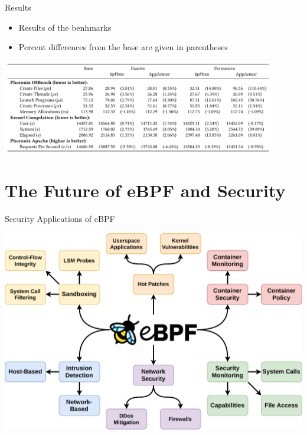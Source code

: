 \documentclass[12pt, dvipsnames, aspectratio=169]{beamer}
\begin{document}
\begin{frame}[c]{Results}
\begin{itemize}
    \item Results of the benhmarks
    \item Percent differences from the base are given in parentheses
\end{itemize}
\begin{center}
    \includegraphics[width=0.9\textwidth]{figs/performance-table.png}
\end{center}
\end{frame}

\section{The Future of eBPF and Security}

\begin{frame}[c]{Security Applications of eBPF}
\begin{center}
    \color{black}
    \includegraphics[height=0.8\textheight]{figs/ebpf-security.pdf}
\end{center}
\end{frame}
\end{document}

